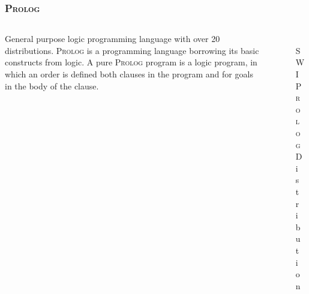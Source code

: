 \documentclass[hideothersubsections, t, aspectratio=1610]{beamer}
\newcommand{\progLang}[1]{\textsc{#1}}
\begin{document}
\begin{frame}
\frametitle{\progLang{Prolog}}
  \begin{columns}[T]
    \begin{column}{.6\textwidth}
     \begin{block}{}
General purpose logic programming language with over 20 distributions. \progLang{Prolog} is a programming language borrowing its basic 
constructs from logic. A pure \progLang{Prolog} program is a logic program, in which an order is defined both clauses in the program and 
for goals in the body of the clause.
    \end{block}
    \end{column}
    \begin{column}{.4\textwidth}
    \begin{block}{}
\begin{figure}
    \includegraphics[width=\textwidth]{swipl.png} 
    \caption{\textsc{SWI Prolog} Distribution}
 \end{figure}   
    \end{block}
    \end{column}
  \end{columns}
\end{frame}

\end{document}
